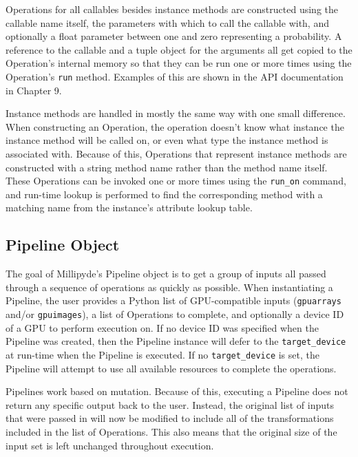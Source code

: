 \quad Operations for all callables besides instance methods are constructed using the callable name itself, the parameters with which to call the callable with, and optionally a float parameter between one and zero representing a probability. A reference to the callable and a tuple object for the arguments all get copied to the Operation's internal memory so that they can be run one or more times using the Operation's \verb|run| method. Examples of this are shown in the API documentation in Chapter 9.

\quad Instance methods are handled in mostly the same way with one small difference. When constructing an Operation, the operation doesn't know what instance the instance method will be called on, or even what type the instance method is associated with. Because of this, Operations that represent instance methods are constructed with a string method name rather than the method name itself. These Operations can be invoked one or more times using the \verb|run_on| command, and run-time lookup is performed to find the corresponding method with a matching name from the instance's attribute lookup table. 

\subsection{Pipeline Object}

The goal of Millipyde's Pipeline object is to get a group of inputs all passed through a sequence of operations as quickly as possible. When instantiating a Pipeline, the user provides a Python list of GPU-compatible inputs (\verb|gpuarrays| and/or \verb|gpuimages|), a list of Operations to complete, and optionally a device ID of a GPU to perform execution on. If no device ID was specified when the Pipeline was created, then the Pipeline instance will defer to the \verb|target_device| at run-time when the Pipeline is executed. If no \verb|target_device| is set, the Pipeline will attempt to use all available resources to complete the operations.

\quad Pipelines work based on mutation. Because of this, executing a Pipeline does not return any specific output back to the user. Instead, the original list of inputs that were passed in will now be modified to include all of the transformations included in the list of Operations. This also means that the original size of the input set is left unchanged throughout execution.

